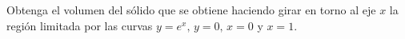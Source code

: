 \item Obtenga el volumen del sólido que se obtiene haciendo girar en torno al eje $x$ la región limitada por las curvas $y = e^x, \, y = 0, \, x = 0$ y $x = 1$.
